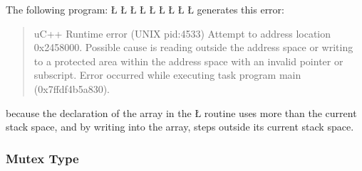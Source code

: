 \documentclass[openright,twoside]{report}
\begin{document}
The following program:
\LGinlinefalse\LGbegin\lgrinde
\L{}
\L{\LB{}}
\L{\LB{}}
\CE{}\L{\LB{}}
\L{\LB{}}
\CE{}\L{\LB{}}
\L{\LB{}}
\CE{}\L{\LB{}}
\L{\LB{\}}}
\endlgrinde\LGend
generates this error:
\begin{quote}
\BGfont
uC++ Runtime error (UNIX pid:4533) Attempt to address location 0x2458000.
Possible cause is reading outside the address space or writing to a protected area within the address space with an invalid pointer or subscript.
Error occurred while executing task program main (0x7ffdf4b5a830).
\end{quote}
because the declaration of the array in the \LGinlinetrue\LGbegin\lgrinde\L{}\endlgrinde\LGend{} routine uses more than the current stack space, and by writing into the array, steps outside its current stack space.


\subsubsection{Mutex Type}
\label{s:MessagesMutexType}
\end{document}

